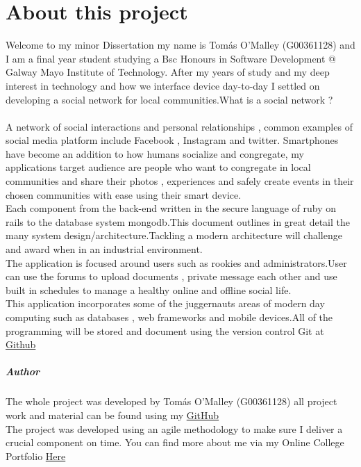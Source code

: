 
\chapter*{About this project}
 
 
 
 Welcome to my minor Dissertation my name is Tomás O'Malley (G00361128) and I am a final year student studying  a Bsc Honours in Software Development @ Galway Mayo Institute of Technology. After my years of study and my deep interest in technology and how we interface device day-to-day I settled on developing a social network for local communities.What is a social network ?\\ \\ 
 
 A network of social interactions and personal relationships , common examples of social media platform include Facebook , Instagram and twitter. Smartphones have become an addition to how humans socialize and congregate, my applications target audience are people who want to congregate in local communities and share their photos , experiences and safely create events in their chosen communities with ease using their smart device. \\
 
 Each component from the back-end written in the secure language  of ruby on rails to the database system mongodb.This document outlines in great detail the many system design/architecture.Tackling a modern architecture will challenge and award when in an industrial environment.\\
 
 The application is focused around users such as rookies and administrators.User can use the forums to upload documents , private message each other and use  built in schedules to manage a healthy online and offline social life.\\
 
 This application incorporates some of the juggernauts  areas of modern day computing such as databases , web frameworks and mobile devices.All of the programming will be stored and document using the version control Git at \href{https://github.com/OmalleyTomas98/MinorDissertation}{Github} \\
 
 


\paragraph{Author}
  The whole project was developed by Tomás O'Malley (G00361128) all project work and material can be found using my \href{https://github.com/OmalleyTomas98/MinorDissertation}{GitHub} \\The project was developed using an agile methodology to make sure I deliver a crucial component on time.
 You can find more about me via my Online College Portfolio  \href{https://omalleytomas98.github.io}{Here}



